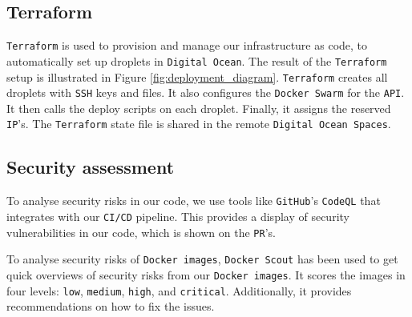 \subsection{Terraform}
\texttt{Terraform} is used to provision and manage our infrastructure as code, 
to automatically set up droplets in \texttt{Digital Ocean}. 
The result of the \texttt{Terraform} setup is illustrated 
in Figure \ref{fig:deployment_diagram}.
\texttt{Terraform} creates all droplets with \texttt{SSH} keys and files.
It also configures the \texttt{Docker Swarm} for the \texttt{API}.
It then calls the deploy scripts on each droplet.
Finally, it assigns the reserved \texttt{IP}'s.
The \texttt{Terraform} state file is shared in the remote \texttt{Digital Ocean Spaces}.

\subsection{Security assessment}
To analyse security risks in our code, 
we use tools like \texttt{GitHub}'s \texttt{CodeQL}\cite{codeql} that 
integrates with our \texttt{CI/CD} pipeline.
This provides a display of security vulnerabilities in our code,
which is shown on the \texttt{PR}'s.

To analyse security risks of \texttt{Docker images}, \texttt{Docker Scout} has been used to get
quick overviews of security risks from our \texttt{Docker images}.
It scores the images in four levels: \texttt{low}, \texttt{medium}, \texttt{high}, and \texttt{critical}.
Additionally, it provides recommendations on how to fix the issues.

